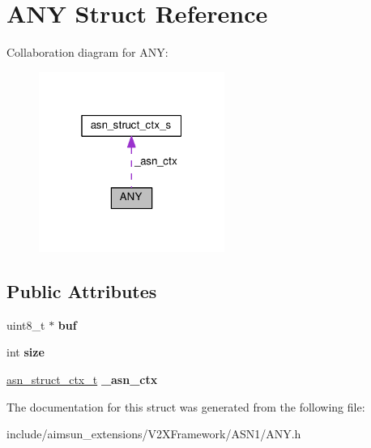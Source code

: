 \hypertarget{structANY}{}\section{A\+NY Struct Reference}
\label{structANY}


Collaboration diagram for A\+NY\+:\nopagebreak
\begin{figure}[H]
\begin{center}
\leavevmode
\includegraphics[width=172pt]{structANY__coll__graph}
\end{center}
\end{figure}
\subsection*{Public Attributes}
\begin{DoxyCompactItemize}
\item 
uint8\+\_\+t $\ast$ {\bfseries buf}\hypertarget{structANY_aa7fa72b14b21b2bf1a62b27b8a100c12}{}\label{structANY_aa7fa72b14b21b2bf1a62b27b8a100c12}

\item 
int {\bfseries size}\hypertarget{structANY_a0bdabe351f3c4ec465f659d3484e7b67}{}\label{structANY_a0bdabe351f3c4ec465f659d3484e7b67}

\item 
\hyperlink{structasn__struct__ctx__s}{asn\+\_\+struct\+\_\+ctx\+\_\+t} {\bfseries \+\_\+asn\+\_\+ctx}\hypertarget{structANY_a44c170a6a47e78a956a3aa748e869168}{}\label{structANY_a44c170a6a47e78a956a3aa748e869168}

\end{DoxyCompactItemize}


The documentation for this struct was generated from the following file\+:\begin{DoxyCompactItemize}
\item 
include/aimsun\+\_\+extensions/\+V2\+X\+Framework/\+A\+S\+N1/A\+N\+Y.\+h\end{DoxyCompactItemize}
